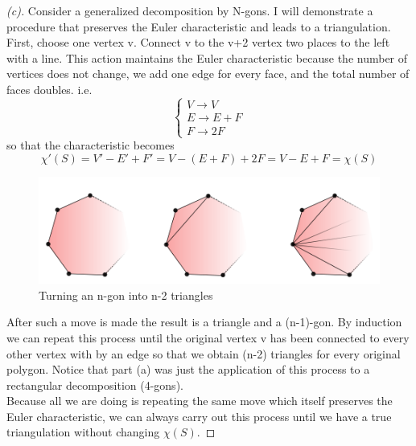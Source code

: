 \documentclass[a4paper, 11pt]{article}
\begin{document}
		\begin{proof}[(c)]
			Consider a generalized decomposition by N-gons. I will demonstrate a procedure that preserves the Euler characteristic and leads to a triangulation. First, choose one vertex v. Connect v to the v+2 vertex two places to the left with a line. This action maintains the Euler characteristic because the number of vertices does not change, we add one edge for every face, and the total number of faces doubles. i.e. 
				\begin{equation*}
					\begin{cases}
						V \to V \\ 
						E \to E + F \\ 
						F \to 2F
					\end{cases}
				\end{equation*}	
			so that the characteristic becomes 
				\begin{equation*}
					\chi'(S) = V'-E'+F' = V-(E+F)+2F = V-E+F = \chi(S)
				\end{equation*}
				
				
			\begin{figure}[!hbt]
				\centering
				\includegraphics[width=0.5\columnwidth]{ngon}
				\caption{Turning an n-gon into n-2 triangles}
				\label{fig:ngon} 
			\end{figure}
			
			\noindent After such a move is made the result is a triangle and a (n-1)-gon. By induction we can repeat this process until the original vertex v has been connected to every other vertex with by an edge so that we obtain (n-2) triangles for every original polygon. Notice that part (a) was just the application of this process to a rectangular decomposition (4-gons).\\ 
			
			\noindent Because all we are doing is repeating the same move which itself preserves the Euler characteristic, we can always carry out this process until we have a true triangulation without changing $\chi(S)$. 
		\end{proof}
		
		
\end{document}
